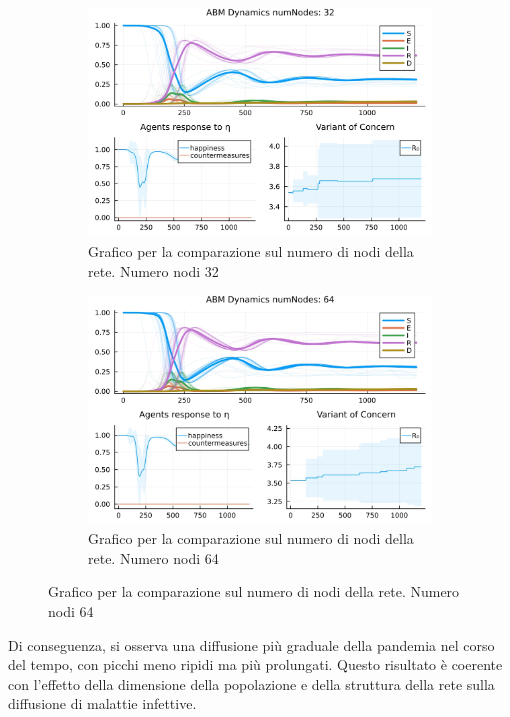 \begin{figure}[H]
\begin{subfigure}[b]{0.45\textwidth}
		\includegraphics[width=\textwidth]{img/SocialNetworkABM_3_NN.jpg}
		\caption{Grafico per la comparazione sul numero di nodi della rete. Numero nodi 32}
		\label{fig:comparison_numberOfNodes_32}
	\end{subfigure}
	\hfill
	\begin{subfigure}[b]{0.45\textwidth}
		\centering
		\includegraphics[width=\textwidth]{img/SocialNetworkABM_4_NN.jpg}
		\caption{Grafico per la comparazione sul numero di nodi della rete. Numero nodi 64}
		\label{fig:comparison_numberOfNodes_64}
	\end{subfigure}
\end{figure}

Di conseguenza, si osserva una diffusione più graduale della pandemia 
nel corso del tempo, con picchi meno ripidi ma più prolungati. 
Questo risultato è coerente con l'effetto della dimensione della 
popolazione e della struttura della rete sulla diffusione di malattie 
infettive.


